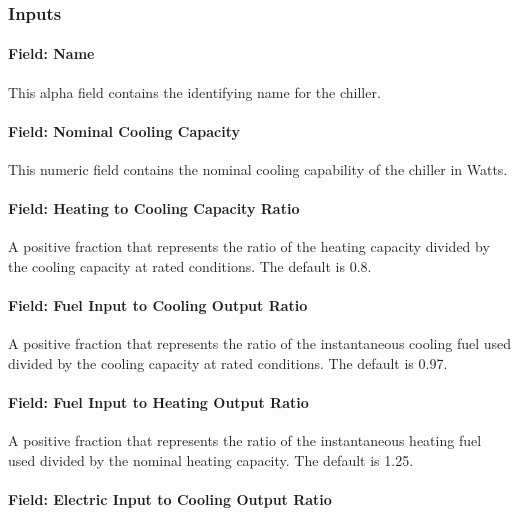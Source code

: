 \subsubsection{Inputs}\label{inputs-8-016}

\paragraph{Field: Name}\label{field-name-7-014}

This alpha field contains the identifying name for the chiller.

\paragraph{Field: Nominal Cooling Capacity}\label{field-nominal-cooling-capacity}

This numeric field contains the nominal cooling capability of the chiller in Watts.

\paragraph{Field: Heating to Cooling Capacity Ratio}\label{field-heating-to-cooling-capacity-ratio}

A positive fraction that represents the ratio of the heating capacity divided by the cooling capacity at rated conditions. The default is 0.8.

\paragraph{Field: Fuel Input to Cooling Output Ratio}\label{field-fuel-input-to-cooling-output-ratio}

A positive fraction that represents the ratio of the instantaneous cooling fuel used divided by the cooling capacity at rated conditions. The default is 0.97.

\paragraph{Field: Fuel Input to Heating Output Ratio}\label{field-fuel-input-to-heating-output-ratio}

A positive fraction that represents the ratio of the instantaneous heating fuel used divided by the nominal heating capacity. The default is 1.25.

\paragraph{Field: Electric Input to Cooling Output Ratio}\label{field-electric-input-to-cooling-output-ratio}


